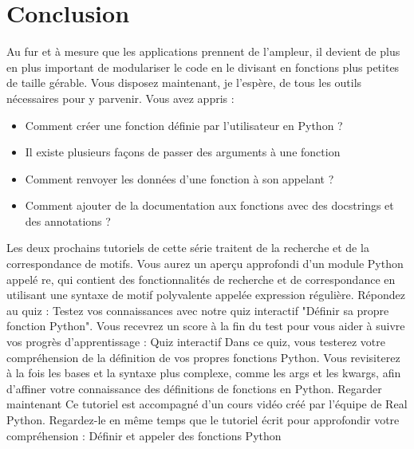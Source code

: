 \section{Conclusion}
Au fur et à mesure que les applications prennent de l'ampleur, il devient de plus en plus important de modulariser le code en le divisant en fonctions plus petites de taille gérable.  Vous disposez maintenant, je l'espère, de tous les outils nécessaires pour y parvenir.
Vous avez appris :
\begin{itemize}
\item Comment créer une fonction définie par l'utilisateur en Python ?
\item Il existe plusieurs façons de passer des arguments à une fonction
\item Comment renvoyer les données d'une fonction à son appelant ?
\item Comment ajouter de la documentation aux fonctions avec des docstrings et des annotations ?
\end{itemize}
Les deux prochains tutoriels de cette série traitent de la recherche et de la correspondance de motifs.  Vous aurez un aperçu approfondi d'un module Python appelé re, qui contient des fonctionnalités de recherche et de correspondance en utilisant une syntaxe de motif polyvalente appelée expression régulière.
 Répondez au quiz : Testez vos connaissances avec notre quiz interactif "Définir sa propre fonction Python". Vous recevrez un score à la fin du test pour vous aider à suivre vos progrès d'apprentissage :
Quiz interactif
Dans ce quiz, vous testerez votre compréhension de la définition de vos propres fonctions Python. Vous revisiterez à la fois les bases et la syntaxe plus complexe, comme les args et les kwargs, afin d'affiner votre connaissance des définitions de fonctions en Python.
 Regarder maintenant Ce tutoriel est accompagné d'un cours vidéo créé par l'équipe de Real Python. Regardez-le en même temps que le tutoriel écrit pour approfondir votre compréhension : Définir et appeler des fonctions Python